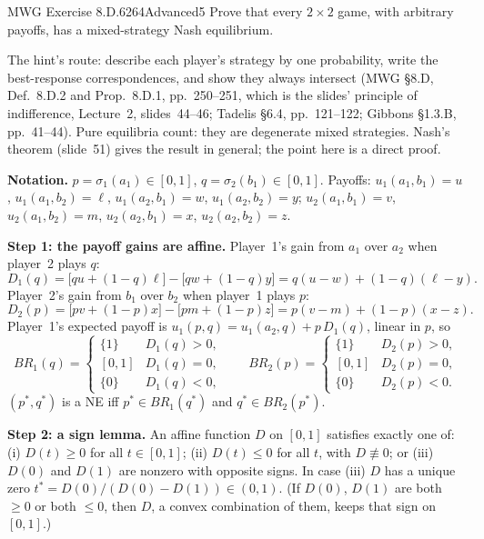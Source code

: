\begin{exsol}{MWG Exercise 8.D.6}{264}{Advanced}{5}
\asked Prove that every $2\times2$ game, with arbitrary payoffs, has a mixed-strategy Nash equilibrium.

\method The hint's route: describe each player's strategy by one probability, write the
best-response correspondences, and show they always intersect (MWG \S8.D, Def.~8.D.2 and
Prop.~8.D.1, pp.~250--251, which is the slides' principle of indifference, Lecture~2,
slides~44--46; Tadelis \S6.4, pp.~121--122; Gibbons \S1.3.B, pp.~41--44). Pure equilibria count:
they are degenerate mixed strategies. Nash's theorem (slide~51) gives the result in general; the
point here is a direct proof.

\solution
\textbf{Notation.} $p = \sigma_1(a_1) \in [0,1]$, $q = \sigma_2(b_1) \in [0,1]$. Payoffs:
$u_1(a_1,b_1) = u$, $u_1(a_1,b_2) = \ell$, $u_1(a_2,b_1) = w$, $u_1(a_2,b_2) = y$;
$u_2(a_1,b_1) = v$, $u_2(a_1,b_2) = m$, $u_2(a_2,b_1) = x$, $u_2(a_2,b_2) = z$.

\textbf{Step 1: the payoff gains are affine.} Player~1's gain from $a_1$ over $a_2$ when player~2
plays $q$:
\[
  D_1(q) = \big[qu + (1-q)\ell\big] - \big[qw + (1-q)y\big] = q(u - w) + (1-q)(\ell - y). \tag{1}
\]
Player~2's gain from $b_1$ over $b_2$ when player~1 plays $p$:
\[
  D_2(p) = \big[pv + (1-p)x\big] - \big[pm + (1-p)z\big] = p(v - m) + (1-p)(x - z). \tag{2}
\]
Player~1's expected payoff is $u_1(p,q) = u_1(a_2,q) + p\,D_1(q)$, linear in $p$, so
\[
  BR_1(q) = \begin{cases} \{1\} & D_1(q) > 0,\\ [0,1] & D_1(q) = 0,\\ \{0\} & D_1(q) < 0,\end{cases}
  \qquad
  BR_2(p) = \begin{cases} \{1\} & D_2(p) > 0,\\ [0,1] & D_2(p) = 0,\\ \{0\} & D_2(p) < 0.\end{cases} \tag{3}
\]
$(p^*, q^*)$ is a NE iff $p^* \in BR_1(q^*)$ and $q^* \in BR_2(p^*)$.

\textbf{Step 2: a sign lemma.} An affine function $D$ on $[0,1]$ satisfies exactly one of:
(i) $D(t) \ge 0$ for all $t \in [0,1]$; (ii) $D(t) \le 0$ for all $t$, with $D \not\equiv 0$; or
(iii) $D(0)$ and $D(1)$ are nonzero with opposite signs. In case (iii) $D$ has a unique zero
$t^* = D(0)/(D(0) - D(1)) \in (0,1)$. (If $D(0)$, $D(1)$ are both $\ge 0$ or both $\le 0$, then
$D$, a convex combination of them, keeps that sign on $[0,1]$.)


\end{exsol}
